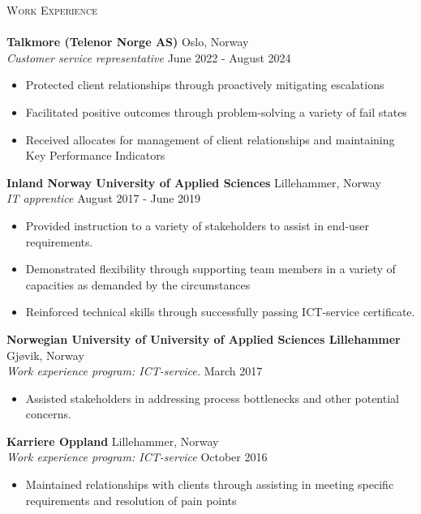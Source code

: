 \documentclass[a4paper]{article}
\newcommand{\lineunder} {
    \vspace*{-8pt} \\
    \hspace*{-18pt} \hrulefill \\
}
\newcommand{\header} [1] {
    {\hspace*{-18pt}\vspace*{6pt} \textsc{#1}}
    \vspace*{-6pt} \lineunder
}
\begin{document}
\header{Work Experience}
\vspace{1mm}
\textbf{Talkmore (Telenor
Norge AS)} \hfill Oslo, Norway\\
\textit{Customer service representative} \hfill June 2022 - August 2024\\
\vspace{-1mm}
\begin{itemize} \itemsep 1pt
	\item Protected client relationships through proactively mitigating escalations 
	\item Facilitated positive outcomes through problem-solving a variety of fail states  
    \item Received allocates for management of client relationships and maintaining Key Performance Indicators   
\end{itemize}
\textbf{Inland Norway
University of Applied Sciences} \hfill Lillehammer, Norway\\
\textit{IT apprentice} \hfill August 2017 - June 2019\\
\vspace{-1mm}
\begin{itemize} \itemsep 1pt
	\item Provided instruction to a variety of stakeholders to assist in end-user requirements. 
	\item Demonstrated flexibility through supporting team members in a variety of capacities as demanded by the circumstances
	\item Reinforced technical skills through successfully passing ICT-service certificate.
\end{itemize}
\textbf{Norwegian University of University
of Applied Sciences Lillehammer} \hfill Gjøvik, Norway\\
\textit{Work experience program: ICT-service.} \hfill March 2017\\
\vspace{-1mm}
\begin{itemize} \itemsep 1pt
	\item Assisted stakeholders in addressing process bottlenecks and other potential concerns. 
\end{itemize}
\textbf{Karriere Oppland} \hfill Lillehammer, Norway\\
\textit{Work experience program: ICT-service} \hfill October 2016\\
\begin{itemize} \itemsep 1pt
	\item Maintained relationships with clients through assisting in meeting specific requirements and resolution of pain points 
\end{itemize}
\end{document}
